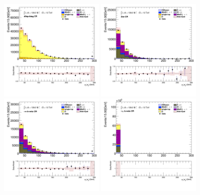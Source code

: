 		\begin{figure}[!htp]
			\begin{center}    
			\includegraphics[width=0.45\textwidth]{chapters/chapter6_HPlus/images/taulep/el_0_pt_DILEP_BTAG.png}
			\includegraphics[width=0.45\textwidth]{chapters/chapter6_HPlus/images/taulep/el_0_pt_ZEE.png} \\
			\includegraphics[width=0.45\textwidth]{chapters/chapter6_HPlus/images/taulep/el_0_pt_TAUEL_BVETO.png} 
			\includegraphics[width=0.45\textwidth]{chapters/chapter6_HPlus/images/taulep/el_0_pt_TAUMU_BVETO.png} \\

\end{center}
\end{figure}
